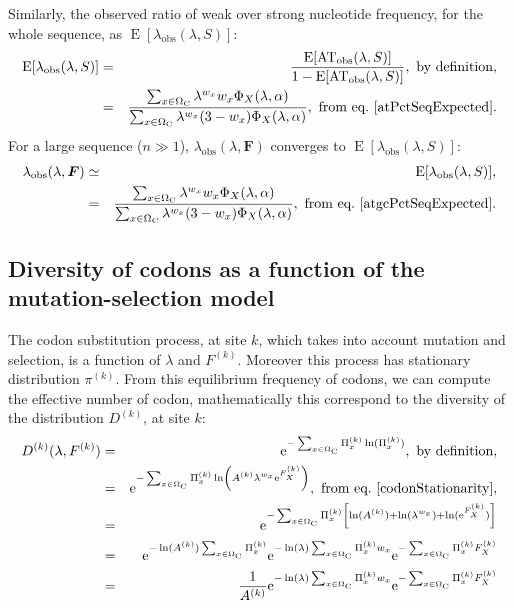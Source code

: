 \documentclass{article}
\newcommand{\e}{\mathrm{e}}
\newcommand{\SetCodon}{\Omega_{\mathrm{C}}}
\begin{document}
    Similarly, the observed ratio of weak over strong nucleotide frequency, for the whole sequence, as $\operatorname{E} [\lambda_{\mathrm{obs}}(\lambda, S)]$: 
    \begin{eqnarray}
	    \operatorname{E} [\lambda_{\mathrm{obs}}(\lambda, S)]
	    & = & \frac{\operatorname{E} [\mathrm{AT_{obs}}(\lambda, S)]}{ 1 - \operatorname{E} [\mathrm{AT_{obs}}(\lambda, S)] }, \ \textrm{by definition},\\
	    & = & \frac{\sum_{x \in \SetCodon} \lambda^{w_x} w_x \Phi_X(\lambda, \alpha)}{\sum_{x \in \SetCodon} \lambda^{w_x} (3 - w_x) \Phi_X(\lambda, \alpha)}, \ \textrm{from eq.} \ \ref{atPctSeqExpected}.
	    \label{atgcPctSeqExpected}
    \end{eqnarray}
    For a large sequence ($ n \gg 1 $), $\lambda_{\mathrm{obs}} (\lambda, \bm{F})$ converges to $\operatorname{E} [\lambda_{\mathrm{obs}}(\lambda, S)]$:
    \begin{eqnarray}
	    \lambda_{\mathrm{obs}} (\lambda, \bm{F})
	    & \simeq & \operatorname{E} [\lambda_{\mathrm{obs}}(\lambda, S)],\\
	    & = & \frac{\sum_{x \in \SetCodon} \lambda^{w_x} w_x \Phi_X(\lambda, \alpha)}{\sum_{x \in \SetCodon} \lambda^{w_x} (3 - w_x) \Phi_X(\lambda, \alpha)}, \ \textrm{from eq.} \ \ref{atgcPctSeqExpected}.
    \end{eqnarray}
    \subsection{Diversity of codons as a function of the mutation-selection model}
    The codon substitution process, at site $k$, which takes into account mutation and selection, is a function of $\lambda$ and $F^{(k)}$. Moreover this process has stationary distribution $\pi^{(k)}$. From this equilibrium frequency of codons, we can compute the effective number of codon, mathematically this correspond to the diversity of the distribution $D^{(k)}$, at site $k$:
    \begin{eqnarray}
	    D^{(k)}(\lambda, F^{(k)})
	    & = & \e^{ - \sum_{x \in \SetCodon}  \Pi_x^{(k)} \ln ( \Pi_x^{(k)} )}, \ \textrm{by definition},\\
	    & = & \e^{ - \sum_{x \in \SetCodon}  \Pi_x^{(k)} \ln \left( A^{(k)} \lambda^{w_x} \e^{F_X^{(k)}} \right)}, \ \textrm{from eq.} \ \ref{codonStationarity},\\
	    & = & \e^{ - \sum_{x \in \SetCodon}  \Pi_x^{(k)} \left[ \ln ( A^{(k)} )+ \ln( \lambda^{w_x} ) + \ln (\e^{F_X^{(k)}}) \right] }\\
	    & = & \e^{ - \ln ( A^{(k)} ) \sum_{x \in \SetCodon}  \Pi_x^{(k)} } \e^{ -  \ln (\lambda) \sum_{x \in \SetCodon}  \Pi_x^{(k)} w_x }\e^{ - \sum_{x \in \SetCodon}  \Pi_x^{(k)} F_X^{(k)}  } \\
	    & = & \frac{1}{A^{(k)}} \e^{ -  \ln (\lambda) \sum_{x \in \SetCodon}  \Pi_x^{(k)} w_x }\e^{ - \sum_{x \in \SetCodon}  \Pi_x^{(k)} F_X^{(k)}  }
	    \label{entropy}
    \end{eqnarray}
\end{document}
